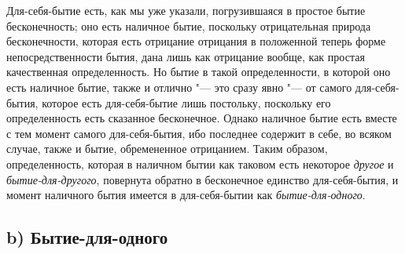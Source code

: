 Для-себя-бытие есть, как мы уже указали, погрузившаяся в простое бытие
бесконечность; оно есть наличное бытие, поскольку отрицательная природа
бесконечности, которая есть отрицание отрицания в положенной теперь форме
непосредственности бытия, дана лишь как отрицание вообще, как простая
качественная определенность. Но бытие в такой определенности, в которой оно
есть наличное бытие, также и отлично "--- это сразу явно "--- от самого
для-себя-бытия, которое есть для-себя-бытие лишь постольку, поскольку его
определенность есть сказанное бесконечное. Однако наличное бытие есть
вместе с тем момент самого для-себя-бытия, ибо последнее содержит в себе,
во всяком случае, также и бытие, обремененное отрицанием. Таким образом,
определенность, которая в наличном бытии как таковом есть некоторое
{\em другое} и {\em бытие-для-другого}, повернута обратно в
бесконечное единство для-себя-бытия, и момент наличного бытия имеется в
для-себя-бытии как {\em бытие-для-одного}.

\subsection[b) Бытие-для-одного]{b) Бытие-для-одного}


